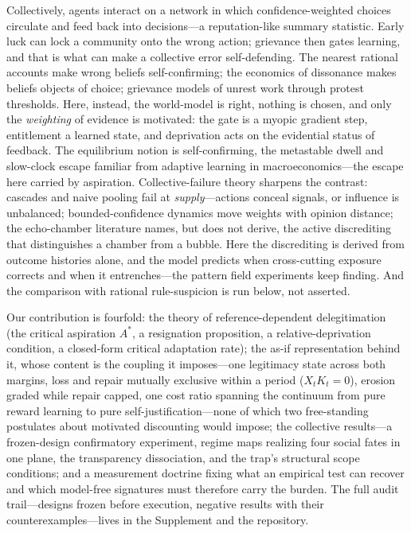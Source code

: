 \documentclass[11pt]{article}
\newcommand{\1}{\mathbf{1}}
\newcommand{\Astar}{A^{*}}
\begin{document}
Collectively, agents interact on a network in which confidence-weighted choices circulate and feed back into decisions---a reputation-like summary statistic\cite{AxelrodHamilton1981}. Early luck can lock a community onto the wrong action; grievance then gates learning, and that is what can make a collective error self-defending. The nearest rational accounts make wrong beliefs self-confirming\cite{HeidhuesKoszegiStrack2018,EspondaPouzo2016,Bohren2016,BohrenHauser2021,FrickIijimaIshii2020}; the economics of dissonance makes beliefs objects of choice\cite{AkerlofDickens1982,Rabin1994,Benabou2013}; grievance models of unrest work through protest thresholds\cite{Epstein2002}. Here, instead, the world-model is right, nothing is chosen, and only the \emph{weighting} of evidence is motivated: the gate is a myopic gradient step, entitlement a learned state, and deprivation acts on the evidential status of feedback. The equilibrium notion is self-confirming\cite{FudenbergLevine1993}, the metastable dwell and slow-clock escape familiar from adaptive learning in macroeconomics\cite{EvansHonkapohja2001,ChoWilliamsSargent2002}---the escape here carried by aspiration. Collective-failure theory sharpens the contrast: cascades and naive pooling fail at \emph{supply}---actions conceal signals, or influence is unbalanced\cite{Banerjee1992,BikhchandaniHirshleiferWelch1992,DeGroot1974,GolubJackson2010}; bounded-confidence dynamics move weights with opinion distance\cite{HegselmannKrause2002}; the echo-chamber literature names, but does not derive, the active discrediting that distinguishes a chamber from a bubble\cite{Nguyen2020,Cinelli2021}. Here the discrediting is derived from outcome histories alone, and the model predicts when cross-cutting exposure corrects and when it entrenches---the pattern field experiments keep finding\cite{Bail2018}. And the comparison with rational rule-suspicion is run below, not asserted.

Our contribution is fourfold: the theory of reference-dependent delegitimation (the critical aspiration $\Astar$, a resignation proposition, a relative-deprivation condition, a closed-form critical adaptation rate); the as-if representation behind it, whose content is the coupling it imposes---one legitimacy state across both margins, loss and repair mutually exclusive within a period ($X_tK_t=0$), erosion graded while repair capped, one cost ratio spanning the continuum from pure reward learning to pure self-justification---none of which two free-standing postulates about motivated discounting\cite{Festinger1957,Kunda1990} would impose; the collective results---a frozen-design confirmatory experiment, regime maps realizing four social fates in one plane, the transparency dissociation, and the trap's structural scope conditions; and a measurement doctrine fixing what an empirical test can recover and which model-free signatures must therefore carry the burden. The full audit trail---designs frozen before execution, negative results with their counterexamples---lives in the Supplement and the repository.
\end{document}
